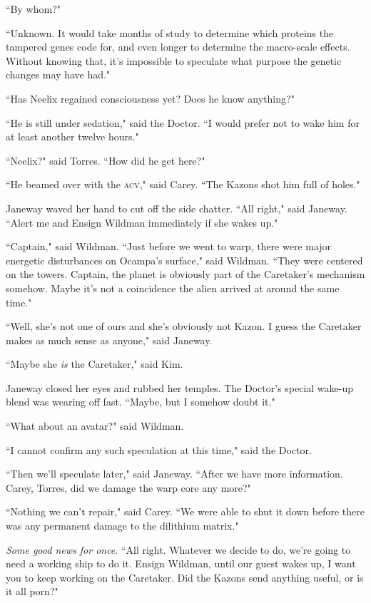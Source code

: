 \documentclass[twoside,letterpaper,12pt]{memoir}
\begin{document}
``By whom?" 

``Unknown. It would take months of study to determine which proteins the tampered genes code for, and even longer to determine the macro-scale effects. Without knowing that, it's impossible to speculate what purpose the genetic changes may have had." 

``Has Neelix regained consciousness yet? Does he know anything?" 

``He is still under sedation," said the Doctor. ``I would prefer not to wake him for at least another twelve hours." 

``Neelix?" said Torres. ``How did he get here?" 

``He beamed over with the \textsc{acv}," said Carey. ``The Kazons shot him full of holes." 

Janeway waved her hand to cut off the side chatter. ``All right," said Janeway. ``Alert me and Ensign Wildman immediately if she wakes up." 

``Captain," said Wildman. ``Just before we went to warp, there were major energetic disturbances on Ocampa's surface," said Wildman. ``They were centered on the towers. Captain, the planet is obviously part of the Caretaker's mechanism somehow. Maybe it's not a coincidence the alien arrived at around the same time." 

``Well, she's not one of ours and she's obviously not Kazon. I guess the Caretaker makes as much sense as anyone," said Janeway. 

``Maybe she \textit{is} the Caretaker," said Kim. 

Janeway closed her eyes and rubbed her temples. The Doctor's special wake-up blend was wearing off fast. ``Maybe, but I somehow doubt it." 

``What about an avatar?" said Wildman. 

``I cannot confirm any such speculation at this time," said the Doctor. 

``Then we'll speculate later," said Janeway. ``After we have more information. Carey, Torres, did we damage the warp core any more?" 

``Nothing we can't repair," said Carey. ``We were able to shut it down before there was any permanent damage to the dilithium matrix." 

\textit{Some good news for once}. ``All right. Whatever we decide to do, we're going to need a working ship to do it. Ensign Wildman, until our guest wakes up, I want you to keep working on the Caretaker. Did the Kazons send anything useful, or is it all porn?" 
\end{document}
